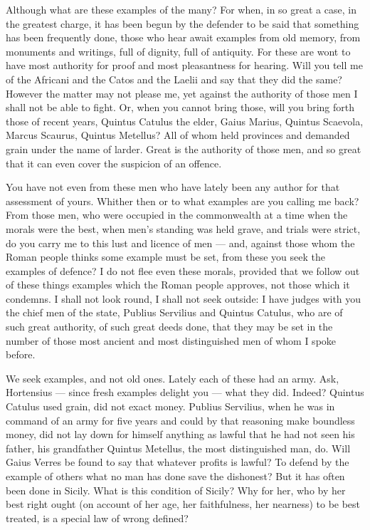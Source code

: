  Although what are these examples of the many? For when, in so great a case, in the greatest charge, it has been begun by the defender to be said that something has been frequently done, those who hear await examples from old memory, from monuments and writings, full of dignity, full of antiquity. For these are wont to have most authority for proof and most pleasantness for hearing. Will you tell me of the Africani and the Catos and the Laelii and say that they did the same? However the matter may not please me, yet against the authority of those men I shall not be able to fight. Or, when you cannot bring those, will you bring forth those of recent years, Quintus Catulus the elder, Gaius Marius, Quintus Scaevola, Marcus Scaurus, Quintus Metellus? All of whom held provinces and demanded grain under the name of larder. Great is the authority of those men, and so great that it can even cover the suspicion of an offence.

 You have not even from these men who have lately been any author for that assessment of yours. Whither then or to what examples are you calling me back? From those men, who were occupied in the commonwealth at a time when the morals were the best, when men's standing was held grave, and trials were strict, do you carry me to this lust and licence of men --- and, against those whom the Roman people thinks some example must be set, from these you seek the examples of defence? I do not flee even these morals, provided that we follow out of these things examples which the Roman people approves, not those which it condemns. I shall not look round, I shall not seek outside: I have judges with you the chief men of the state, Publius Servilius and Quintus Catulus, who are of such great authority, of such great deeds done, that they may be set in the number of those most ancient and most distinguished men of whom I spoke before.

 We seek examples, and not old ones. Lately each of these had an army. Ask, Hortensius --- since fresh examples delight you --- what they did. Indeed? Quintus Catulus used grain, did not exact money. Publius Servilius, when he was in command of an army for five years and could by that reasoning make boundless money, did not lay down for himself anything as lawful that he had not seen his father, his grandfather Quintus Metellus, the most distinguished man, do. Will Gaius Verres be found to say that whatever profits is lawful? To defend by the example of others what no man has done save the dishonest? But it has often been done in Sicily. What is this condition of Sicily? Why for her, who by her best right ought (on account of her age, her faithfulness, her nearness) to be best treated, is a special law of wrong defined?

